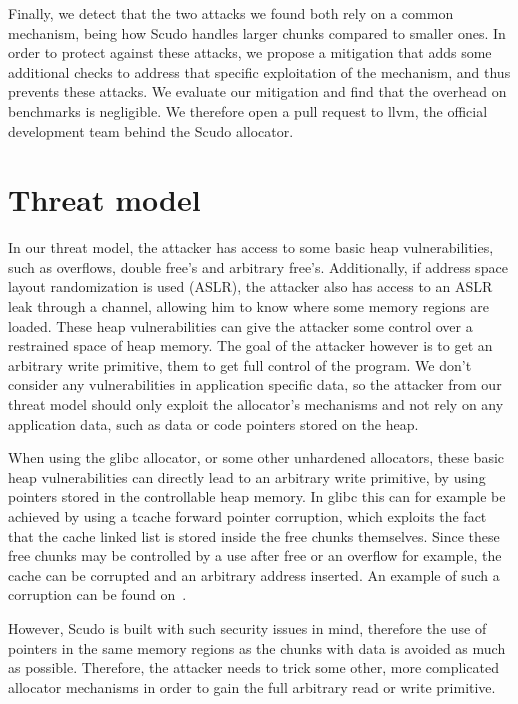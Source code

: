 \documentclass[a4paper,11pt,oneside]{report}
\begin{document}
Finally, we detect that the two attacks we found both rely on a common mechanism, being how
Scudo handles larger chunks compared to smaller ones. In order to protect against these
attacks, we propose a mitigation that adds some additional checks to address that specific
exploitation of the mechanism, and thus prevents these attacks. We evaluate our mitigation
and find that the overhead on benchmarks is negligible. We therefore open a pull request
to llvm, the official development team behind the Scudo allocator.

\chapter{Threat model}

In our threat model, the attacker has access to some basic heap vulnerabilities, such
as overflows, double free's and arbitrary free's. Additionally, if address space layout
randomization is used (ASLR), the attacker also has access to an ASLR leak through a
channel, allowing him to know where some memory regions are loaded.
These heap vulnerabilities can give the
attacker some control over a restrained space of heap memory. The goal of the attacker
however is to get an arbitrary write primitive, them to get full control of the 
program. We don't consider any vulnerabilities in application specific data, so the
attacker from our threat model should only exploit the allocator's mechanisms and not rely
on any application data, such as data or code pointers stored on the heap.

When using the glibc allocator, or some other unhardened allocators, these basic heap
vulnerabilities can directly lead to an arbitrary write primitive, by using pointers
stored in the controllable heap memory. In glibc this can for example be achieved by using
a tcache forward pointer corruption, which exploits the fact that the cache linked list is
stored inside the free chunks themselves. Since these free chunks may be controlled by a
use after free or an overflow for example, the cache can be corrupted and an arbitrary
address inserted. An example of such a corruption can be found on~\cite{tcachePoisoning}.

However, Scudo is built with such security issues in mind, therefore the use of pointers in
the same memory regions as the chunks with data is avoided as much as possible. Therefore,
the attacker needs to trick some other, more complicated allocator mechanisms in order to
gain the full arbitrary read or write primitive.
\end{document}
